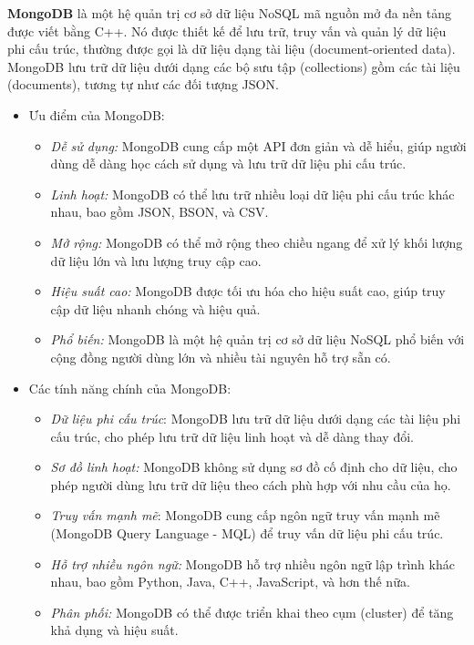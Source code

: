 \textbf{MongoDB} là một hệ quản trị cơ sở dữ liệu NoSQL mã nguồn mở đa nền tảng được viết bằng C++. Nó được thiết kế để lưu trữ, truy vấn và quản lý dữ liệu phi cấu trúc, thường được gọi là dữ liệu dạng tài liệu (document-oriented data). MongoDB lưu trữ dữ liệu dưới dạng các bộ sưu tập (collections) gồm các tài liệu (documents), tương tự như các đối tượng JSON.
\begin{itemize}
    \item Ưu điểm của MongoDB:

        \begin{itemize}
            \item \textit{Dễ sử dụng:} MongoDB cung cấp một API đơn giản và dễ hiểu, giúp người dùng dễ dàng học cách sử dụng và lưu trữ dữ liệu phi cấu trúc.
            \item \textit{Linh hoạt:} MongoDB có thể lưu trữ nhiều loại dữ liệu phi cấu trúc khác nhau, bao gồm JSON, BSON, và CSV.
            \item \textit{Mở rộng:} MongoDB có thể mở rộng theo chiều ngang để xử lý khối lượng dữ liệu lớn và lưu lượng truy cập cao.
            \item \textit{Hiệu suất cao:} MongoDB được tối ưu hóa cho hiệu suất cao, giúp truy cập dữ liệu nhanh chóng và hiệu quả.
            \item \textit{Phổ biến:} MongoDB là một hệ quản trị cơ sở dữ liệu NoSQL phổ biến với cộng đồng người dùng lớn và nhiều tài nguyên hỗ trợ sẵn có.
        \end{itemize}

    \item Các tính năng chính của MongoDB:
        \begin{itemize}
            \item \textit{Dữ liệu phi cấu trúc}: MongoDB lưu trữ dữ liệu dưới dạng các tài liệu phi cấu trúc, cho phép lưu trữ dữ liệu linh hoạt và dễ dàng thay đổi.
            \item \textit{Sơ đồ linh hoạt:} MongoDB không sử dụng sơ đồ cố định cho dữ liệu, cho phép người dùng lưu trữ dữ liệu theo cách phù hợp với nhu cầu của họ.
            \item \textit{Truy vấn mạnh mẽ}: MongoDB cung cấp ngôn ngữ truy vấn mạnh mẽ (MongoDB Query Language - MQL) để truy vấn dữ liệu phi cấu trúc.
            \item \textit{Hỗ trợ nhiều ngôn ngữ:} MongoDB hỗ trợ nhiều ngôn ngữ lập trình khác nhau, bao gồm Python, Java, C++, JavaScript, và hơn thế nữa.
            \item \textit{Phân phối:} MongoDB có thể được triển khai theo cụm (cluster) để tăng khả dụng và hiệu suất.
        \end{itemize}
\end{itemize}

